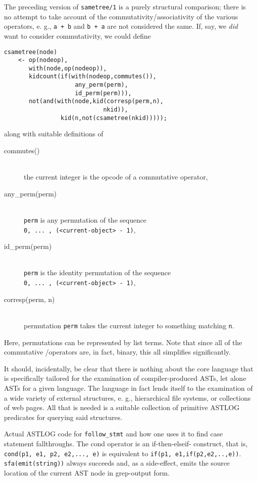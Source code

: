 The preceding version of \verb|sametree/1| is a purely
structural comparison; there is no attempt to take account
of the commutativity/associativity of the various
operators, e. g., \verb|a + b| and \verb|b + a| are not considered
the same. If, say, we \emph{did} want to consider commutativity,
we could define
\begin{verbatim}
csametree(node)
    <- op(nodeop),
       with(node,op(nodeop)),
       kidcount(if(with(nodeop,commutes()),
                    any_perm(perm),
                    id_perm(perm))),
       not(and(with(node,kid(corresp(perm,n),
                            nkid)),
                kid(n,not(csametree(nkid)))));
\end{verbatim}
along with suitable definitions of
\begin{description}
\item[commutes()]\ \\
the current integer is the opcode of a commutative operator,
\item[any\_perm(perm)]\ \\
\verb|perm| is any permutation of the sequence\\
\verb|0, ... , (<current-object> - 1)|,
\item[id\_perm(perm)]\ \\
\verb|perm| is the identity permutation of the sequence\\
\verb|0, ... , (<current-object> - 1)|,
\item[corresp(perm, n)]\ \\
permutation \verb|perm| takes the current integer to something matching
\verb|n|.
\end{description}
Here, permutations can be represented by list terms. Note that since all of the
commutative \ci/\cpp operators are, in fact, binary, this all simplifies
significantly.

It should, incidentally, be clear that there is nothing about the core language
that is specifically tailored for the examination of compiler-produced ASTs, let
alone ASTs for a given language. The language in fact lends itself to the
examination of a wide variety of external structures, e. g., hierarchical file
systems, or collections of web pages. All that is needed is a suitable
collection of primitive ASTLOG predicates for querying said structures.


Actual ASTLOG code for \verb|follow_stmt| and how one uses it to find case
statement fallthroughs. The cond operator is an if-then-elseif- construct, that
is, \verb|cond(p1, e1, p2, e2,..., e)| is equivalent to
\verb|if(p1, e1,if(p2,e2,..,e))|. \verb|sfa(emit(string))| always succeeds and,
as a side-effect, emits the source location of the current AST node in
grep-output form.

